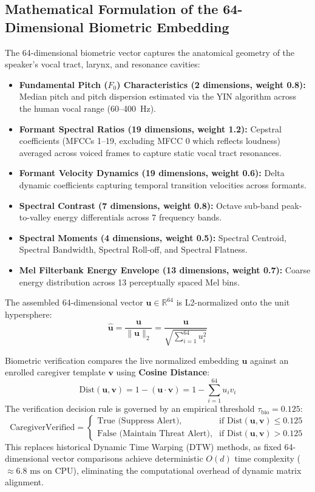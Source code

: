 \documentclass[12pt, a4paper]{report}
\begin{document}
\subsection{Mathematical Formulation of the 64-Dimensional Biometric Embedding}
The 64-dimensional biometric vector captures the anatomical geometry of the speaker's vocal tract, larynx, and resonance cavities:
\begin{itemize}
    \item \textbf{Fundamental Pitch ($F_0$) Characteristics (2 dimensions, weight 0.8):} Median pitch and pitch dispersion estimated via the YIN algorithm across the human vocal range (60--400~Hz).
    \item \textbf{Formant Spectral Ratios (19 dimensions, weight 1.2):} Cepstral coefficients (MFCCs 1--19, excluding MFCC 0 which reflects loudness) averaged across voiced frames to capture static vocal tract resonances.
    \item \textbf{Formant Velocity Dynamics (19 dimensions, weight 0.6):} Delta dynamic coefficients capturing temporal transition velocities across formants.
    \item \textbf{Spectral Contrast (7 dimensions, weight 0.8):} Octave sub-band peak-to-valley energy differentials across 7 frequency bands.
    \item \textbf{Spectral Moments (4 dimensions, weight 0.5):} Spectral Centroid, Spectral Bandwidth, Spectral Roll-off, and Spectral Flatness.
    \item \textbf{Mel Filterbank Energy Envelope (13 dimensions, weight 0.7):} Coarse energy distribution across 13 perceptually spaced Mel bins.
\end{itemize}
The assembled 64-dimensional vector $\mathbf{u} \in \mathbb{R}^{64}$ is L2-normalized onto the unit hypersphere:
\begin{equation}
\hat{\mathbf{u}} = \frac{\mathbf{u}}{\|\mathbf{u}\|_2} = \frac{\mathbf{u}}{\sqrt{\sum_{i=1}^{64} u_i^2}}
\end{equation}

Biometric verification compares the live normalized embedding $\mathbf{u}$ against an enrolled caregiver template $\mathbf{v}$ using \textbf{Cosine Distance}:
\begin{equation}
\label{eq:cosine_distance}
\text{Dist}(\mathbf{u}, \mathbf{v}) = 1 - (\mathbf{u} \cdot \mathbf{v}) = 1 - \sum_{i=1}^{64} u_i v_i
\end{equation}
The verification decision rule is governed by an empirical threshold $\tau_{\text{bio}} = 0.125$:
\begin{equation}
\text{CaregiverVerified} = 
\begin{cases}
\text{True (Suppress Alert)}, & \text{if } \text{Dist}(\mathbf{u}, \mathbf{v}) \le 0.125 \\
\text{False (Maintain Threat Alert)}, & \text{if } \text{Dist}(\mathbf{u}, \mathbf{v}) > 0.125
\end{cases}
\end{equation}
This replaces historical Dynamic Time Warping (DTW) methods, as fixed 64-dimensional vector comparisons achieve deterministic $O(d)$ time complexity ($\approx 6.8\text{ ms}$ on CPU), eliminating the computational overhead of dynamic matrix alignment.
\end{document}

